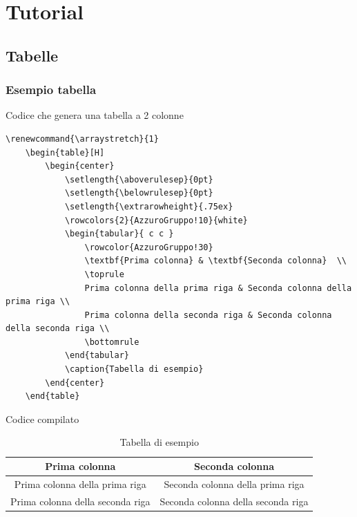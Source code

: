\section{Tutorial}
\subsection{Tabelle}
\subsubsection{Esempio tabella}
Codice che genera una tabella a 2 colonne
\begin{lstlisting}
\renewcommand{\arraystretch}{1}
	\begin{table}[H]
		\begin{center}
			\setlength{\aboverulesep}{0pt}
			\setlength{\belowrulesep}{0pt}
			\setlength{\extrarowheight}{.75ex}
			\rowcolors{2}{AzzuroGruppo!10}{white}
			\begin{tabular}{ c c }
				\rowcolor{AzzuroGruppo!30} 
				\textbf{Prima colonna} & \textbf{Seconda colonna}  \\
				\toprule
				Prima colonna della prima riga & Seconda colonna della prima riga \\
				Prima colonna della seconda riga & Seconda colonna della seconda riga \\
				\bottomrule
			\end{tabular}
			\caption{Tabella di esempio}
		\end{center}
	\end{table}
\end{lstlisting}
Codice compilato
\renewcommand{\arraystretch}{1}
	\begin{table}[H]
		\begin{center}
			\setlength{\aboverulesep}{0pt}
			\setlength{\belowrulesep}{0pt}
			\setlength{\extrarowheight}{.75ex}
			\begin{tabular}{ c c }
				\rowcolor{AzzurroGruppo!30} 
				\textbf{Prima colonna} & \textbf{Seconda colonna}  \\
				\toprule
				Prima colonna della prima riga & Seconda colonna della prima riga \\
				Prima colonna della seconda riga & Seconda colonna della seconda riga \\
				\bottomrule
			\end{tabular}
			\caption{Tabella di esempio}
		\end{center}
	\end{table}

